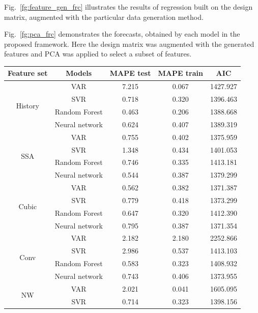 \documentclass[conference]{IEEEtran}
\begin{document}
Fig.~\ref{fg:feature_gen_frc} illustrates the results of regression built on the design matrix, augmented with the particular data generation method.

Fig.~\ref{fg:pca_frc} demonstrates the forecasts, obtained by each model in the proposed framework. Here the design matrix was augmented with the generated features and PCA was applied to select a subset of features.



\begin{table}
\begin{tabular}{|c|c|c|c|c|}
\hline
Feature set & Models &MAPE test & MAPE train & AIC\\
\hline
\multirow{4}{*}{History} &VAR &   7.215 &    0.067 &    1427.927\\
\cline{2-5}
 &SVR &   0.718 &    0.320 &    1396.463\\
\cline{2-5}
 &Random Forest &   0.463 &    0.206 &    1388.668\\
\cline{2-5}
 &Neural network &   0.624 &    0.407 &    1389.319\\
\cline{2-5}
\hline
\multirow{4}{*}{SSA} &VAR &   0.755 &    0.402 &    1375.959\\
\cline{2-5}
 &SVR &   1.348 &    0.434 &    1401.053\\
\cline{2-5}
 &Random Forest &   0.746 &    0.335 &    1413.181\\
\cline{2-5}
 &Neural network &   0.544 &    0.387 &    1379.299\\
\cline{2-5}
\hline
\multirow{4}{*}{Cubic} &VAR &   0.562 &    0.382 &    1371.387\\
\cline{2-5}
 &SVR &   0.779 &    0.418 &    1373.299\\
\cline{2-5}
 &Random Forest &   0.647 &    0.320 &    1412.390\\
\cline{2-5}
 &Neural network &   0.795 &    0.387 &    1371.354\\
\cline{2-5}
\hline
\multirow{4}{*}{Conv} &VAR &   2.182 &    2.180 &    2252.866\\
\cline{2-5}
 &SVR &   2.986 &    0.537 &    1413.103\\
\cline{2-5}
 &Random Forest &   0.583 &    0.323 &    1408.932\\
\cline{2-5}
 &Neural network &   0.743 &    0.406 &    1373.955\\
\cline{2-5}
\hline
\multirow{4}{*}{NW} &VAR &   2.021 &    0.041 &    1605.095\\
\cline{2-5}
 &SVR &   0.714 &    0.323 &    1398.156\\

\end{tabular}
\end{table}
\end{document}
